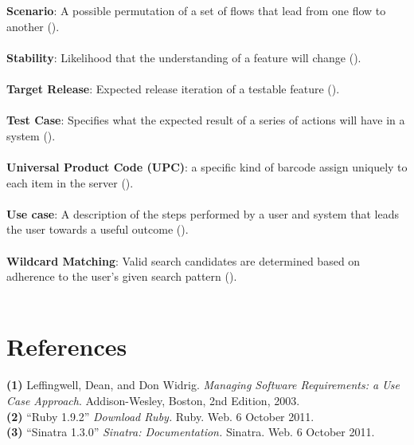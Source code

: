 \documentclass{article}
\begin{document}
\textbf{Scenario}: A possible permutation of a set of flows that lead from one flow to another (\pageref{scenario}).\\ \\
\textbf{Stability}: Likelihood that the understanding of a feature will change (\pageref{feature}).\\ \\
\textbf{Target Release}: Expected release iteration of a testable feature (\pageref{feature}).\\ \\
\textbf{Test Case}: Specifies what the expected result of a series of actions will have in a system (\pageref{test_case}).\\ \\
\textbf{Universal Product Code (UPC)}: a specific kind of barcode assign uniquely to each item in the server (\pageref{upc}).\\ \\
\textbf{Use case}: A description of the steps performed by a user and system that leads the user towards a useful outcome (\pageref{use_case}).\\ \\
\textbf{Wildcard Matching}: Valid search candidates are determined based on adherence to the user's given search pattern (\pageref{feature}).\\ \\

\section{References}
\hangindent=1.4cm
\textbf{(1)} Leffingwell, Dean, and Don Widrig.
\emph{Managing Software Requirements: a Use Case Approach}.
Addison-Wesley, Boston,
2nd Edition,
2003.\\

\noindent\hangindent=1.4cm
\textbf{(2)} ``Ruby 1.9.2''
\emph{Download Ruby.} Ruby. Web.  6 October 2011. \\

\noindent\hangindent=1.4cm
\textbf{(3)} ``Sinatra 1.3.0''
\emph{Sinatra: Documentation.} Sinatra. Web.  6 October 2011.\\
\end{document}
